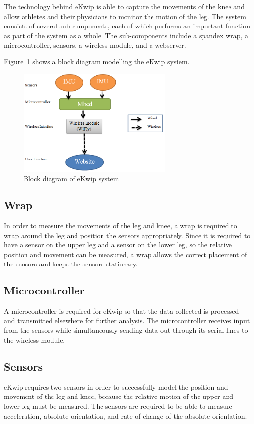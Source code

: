 The technology behind eKwip is able to capture the movements of the knee and allow athletes and their physicians to monitor the motion of the leg. The system consists of several sub-components, each of which performs an important function as part of the system as a whole. The sub-components include a spandex wrap, a microcontroller, sensors, a wireless module, and a webserver.

Figure~\ref{fig:block_diagram} shows a block diagram modelling the eKwip system.

\begin{figure}[h]
  \begin{center}
    \includegraphics[width=3in]{images/block_diagram.PNG}
  \end{center}
  \caption{Block diagram of eKwip system}
  \label{fig:block_diagram}
\end{figure}

\subsection {Wrap}
In order to measure the movements of the leg and knee, a wrap is required to wrap around the leg and position the sensors appropriately. Since it is required to have a sensor on the upper leg and a sensor on the lower leg, so the relative position and movement can be measured, a wrap allows the correct placement of the sensors and keeps the sensors stationary.

\subsection {Microcontroller}
A microcontroller is required for eKwip so that the data collected is processed and transmitted elsewhere for further analysis. The microcontroller receives input from the sensors while simultaneously sending data out through its serial lines to the wireless module.

\subsection {Sensors}
eKwip requires two sensors in order to successfully model the position and movement of the leg and knee, because the relative motion of the upper and lower leg must be measured. The sensors are required to be able to measure acceleration, absolute orientation, and rate of change of the absolute orientation.

